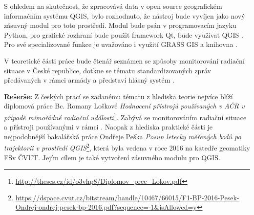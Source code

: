 S ohledem na skutečnost, že  zpracovává data v open source
geografickém informačním systému QGIS, bylo rozhodnuto, že nástroj
bude vyvíjen jako nový zásuvný modul pro toto prostředí. Modul bude
psán v programovacím jazyku Python, pro grafické rozhraní bude použit
framework Qt, bude využívat QGIS . Pro své specializované
funkce je uvažováno i využití GRASS GIS  a knihovna .

V teoretické části práce bude čtenář seznámen se způsoby monitorování
radiační situace v České republice, dotkne se tématu standardizovaných
zpráv předávaných v rámci armády a představí hlásný systém .

\textbf{Rešerše:} Z českých prací se zadanému tématu z hlediska teorie
nejvíce blíží diplomová práce Bc. Romany Loškové \textit{Hodnocení
přístrojů používaných v AČR v případě mimořádné radiační
události}\footnote{\url{http://theses.cz/id/o3vhp8/Diplomov_prce_Lokov.pdf}}. Zabývá
se monitorováním radiační situace a přístroji používanými v rámci
. Naopak z hlediska praktické části je nejpodobnější
bakalářská práce Ondřeje Peška \textit{Posun letecky měřených bodů po
trajektorii v prostředí
QGIS}\footnote{\url{https://dspace.cvut.cz/bitstream/handle/10467/66015/F1-BP-2016-Pesek-Ondrej-ondrej-pesek-bp-2016.pdf?sequence=-1&isAllowed=y}},
která byla vedena v roce 2016 na katedře geomatiky FSv ČVUT. Jejím
cílem je také vytvoření zásuvného modulu pro QGIS.